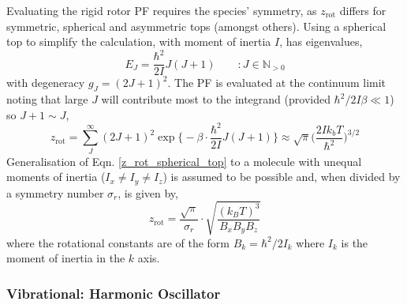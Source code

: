 \documentclass[../main.tex]{subfiles}
\begin{document}
Evaluating the rigid rotor PF requires the species' symmetry, as $z_\text{rot}$ differs for symmetric, spherical and asymmetric tops (amongst others). Using a spherical top to simplify the calculation, with moment of inertia $I$, has eigenvalues,
\begin{equation}
E_J = \frac{\hbar^2}{2I} J(J+1) \qquad: J \in \mathbb{N}_{>0}
\end{equation}
with degeneracy $g_J = (2J + 1)^2$. The PF is evaluated at the continuum limit noting that large $J$ will contribute most to the integrand (provided $\hbar^2/2I\beta \ll 1$) so $J + 1 \sim J$,
\begin{equation}
z_\text{rot} = \sum_{J}^\infty (2J + 1)^2\exp{ {\Big \{} -{\beta}\cdot  \frac{\hbar^2}{2I}J(J+1)}{\Big \}} \approx \sqrt{\pi} {\Big (} \frac{2I k_b T}{\hbar^2} {\Big )}^{3/2}
\label{z_rot_spherical_top}
\end{equation}
Generalisation of Eqn. \eqref{z_rot_spherical_top} to a molecule with unequal moments of inertia ($I_x \neq I_y \neq I_z$) is assumed to be possible and, when divided by a symmetry number $\sigma_r$, is given by,
\begin{equation}
z_\text{rot} = \frac{\sqrt{\pi}}{\sigma_r} \cdot \sqrt{\frac{ (k_B T)^3}{B_x B_y B_z}}
\end{equation}
where the rotational constants are of the form $B_k = \hbar^2/2 I_k $ where $I_k$ is the moment of inertia in the $k$ axis.




\subsubsection{Vibrational: Harmonic Oscillator}
\end{document}
